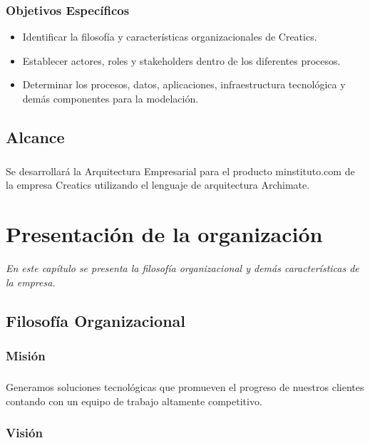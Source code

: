   \subsection{Objetivos Específicos}
    \begin{itemize}
      \item Identificar la filosofía y características organizacionales de Creatics.
      \item Establecer actores, roles y stakeholders dentro de los diferentes procesos.
      \item Determinar los procesos, datos, aplicaciones, infraestructura tecnológica y demás componentes para la modelación.
    \end{itemize}

\section{Alcance}
  \paragraph*{}
  Se desarrollará la Arquitectura Empresarial para el producto minstituto.com de la empresa Creatics utilizando el lenguaje de arquitectura Archimate.

\chapter{Presentación de la organización}
\label{chap:Descripcion}
\textit{En este capítulo se presenta la filosofía organizacional y demás características de la empresa.}
\vfill
\minitoc
\newpage

\section{Filosofía Organizacional}
  
  \subsection{Misión}
    \paragraph*{}
    Generamos soluciones tecnológicas que promueven el progreso de nuestros clientes contando con un equipo de trabajo altamente competitivo.
  
  \subsection{Visión}
